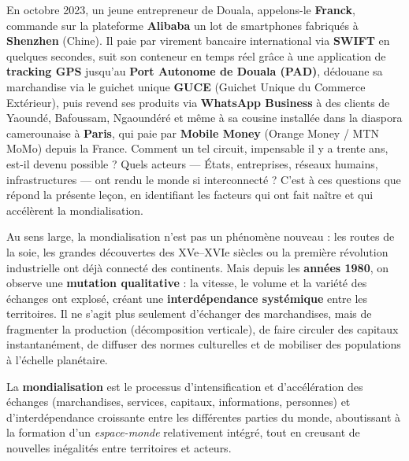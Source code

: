 \documentclass[11pt]{article}
\newcommand{\cle}[1]{{\popxbold\color{popdark}#1}}
\newcounter{popsec}
\newcounter{popsub}
\newcommand{\courssub}[1]{%
  \stepcounter{popsub}%
  \par\vspace{9pt}\noindent{\popxbold\fontsize{11.5}{13}\selectfont\color{popink}{\color{poporange}\thepopsec.\thepopsub}\hspace{6pt}#1}\par\nopagebreak\vspace{4pt}
}
\begin{document}
En octobre 2023, un jeune entrepreneur de Douala, appelons-le \textbf{Franck}, commande sur la plateforme \textbf{Alibaba} un lot de smartphones fabriqués à \textbf{Shenzhen} (Chine). Il paie par virement bancaire international via \textbf{SWIFT} en quelques secondes, suit son conteneur en temps réel grâce à une application de \textbf{tracking GPS} jusqu'au \textbf{Port Autonome de Douala (PAD)}, dédouane sa marchandise via le guichet unique \textbf{GUCE} (Guichet Unique du Commerce Extérieur), puis revend ses produits via \textbf{WhatsApp Business} à des clients de Yaoundé, Bafoussam, Ngaoundéré et même à sa cousine installée dans la diaspora camerounaise à \textbf{Paris}, qui paie par \textbf{Mobile Money} (Orange Money / MTN MoMo) depuis la France. Comment un tel circuit, impensable il y a trente ans, est-il devenu possible ? Quels acteurs — États, entreprises, réseaux humains, infrastructures — ont rendu le monde si interconnecté ? C'est à ces questions que répond la présente leçon, en identifiant les \cle{facteurs} qui ont fait naître et qui accélèrent la \cle{mondialisation}.

\courssub{Définition et compréhension intuitive}

Au sens large, la mondialisation n'est pas un phénomène nouveau : les routes de la soie, les grandes découvertes des XVe–XVIe siècles ou la première révolution industrielle ont déjà connecté des continents. Mais depuis les \textbf{années 1980}, on observe une \textbf{mutation qualitative} : la vitesse, le volume et la variété des échanges ont explosé, créant une \textbf{interdépendance systémique} entre les territoires. Il ne s'agit plus seulement d'échanger des marchandises, mais de fragmenter la production (\cle{décomposition verticale}), de faire circuler des capitaux instantanément, de diffuser des normes culturelles et de mobiliser des populations à l'échelle planétaire.

\begin{definition}[La mondialisation]
La \textbf{mondialisation} est le processus d'intensification et d'accélération des échanges (marchandises, services, capitaux, informations, personnes) et d'interdépendance croissante entre les différentes parties du monde, aboutissant à la formation d'un \emph{espace-monde} relativement intégré, tout en creusant de nouvelles inégalités entre territoires et acteurs.
\end{definition}
\end{document}
